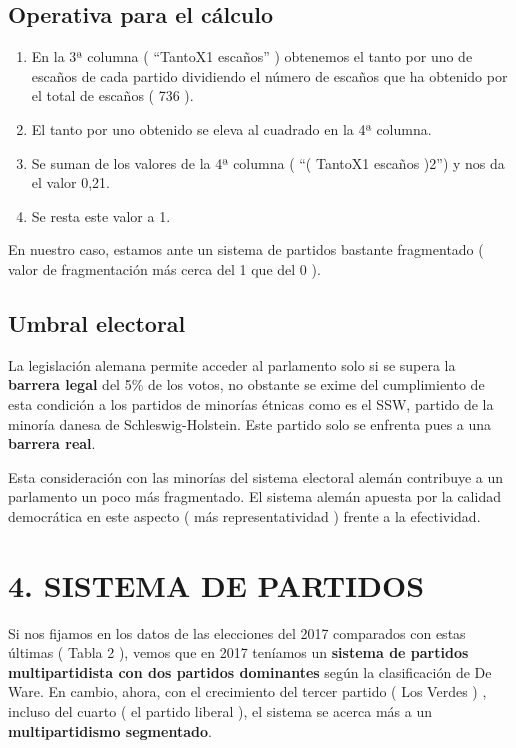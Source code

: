 \documentclass[
]{article}
\providecommand{\tightlist}{%
  \setlength{\itemsep}{0pt}\setlength{\parskip}{0pt}}
\begin{document}
\hypertarget{operativa-para-el-cuxe1lculo}{%
\subsection{Operativa para el
cálculo}\label{operativa-para-el-cuxe1lculo}}

\begin{enumerate}
\def\labelenumi{\arabic{enumi}.}
\tightlist
\item
  En la 3ª columna ( ``TantoX1 escaños'' ) obtenemos el tanto por uno de
  escaños de cada partido dividiendo el número de escaños que ha
  obtenido por el total de escaños ( 736 ).
\item
  El tanto por uno obtenido se eleva al cuadrado en la 4ª columna.
\item
  Se suman de los valores de la 4ª columna ( ``( TantoX1 escaños )2'') y
  nos da el valor 0,21.
\item
  Se resta este valor a 1.
\end{enumerate}

En nuestro caso, estamos ante un sistema de partidos bastante
fragmentado ( valor de fragmentación más cerca del 1 que del 0 ).

\hypertarget{umbral-electoral}{%
\subsection{Umbral electoral}\label{umbral-electoral}}

La legislación alemana permite acceder al parlamento solo si se supera
la \textbf{barrera legal} del 5\% de los votos, no obstante se exime del
cumplimiento de esta condición a los partidos de minorías étnicas como
es el SSW, partido de la minoría danesa de Schleswig-Holstein. Este
partido solo se enfrenta pues a una \textbf{barrera real}.

Esta consideración con las minorías del sistema electoral alemán
contribuye a un parlamento un poco más fragmentado. El sistema alemán
apuesta por la calidad democrática en este aspecto ( más
representatividad ) frente a la efectividad.

\hypertarget{sistema-de-partidos}{%
\section{4. SISTEMA DE PARTIDOS}\label{sistema-de-partidos}}

Si nos fijamos en los datos de las elecciones del 2017 comparados con
estas últimas ( Tabla 2 ), vemos que en 2017 teníamos un \textbf{sistema
de partidos multipartidista con dos partidos dominantes} según la
clasificación de De Ware. En cambio, ahora, con el crecimiento del
tercer partido ( Los Verdes ) , incluso del cuarto ( el partido liberal
), el sistema se acerca más a un \textbf{multipartidismo segmentado}.
\end{document}
